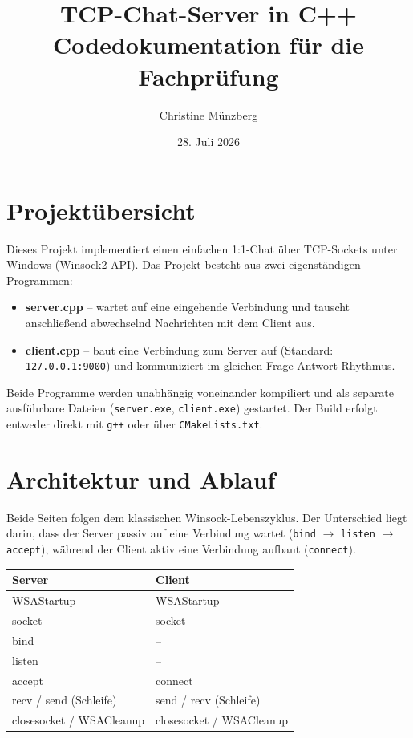 \documentclass[a4paper,11pt]{article}
\title{TCP-Chat-Server in C++\\\large Codedokumentation für die Fachprüfung}
\author{Christine Münzberg}
\date{28. Juli 2026}
\begin{document}
\maketitle
\thispagestyle{empty}

\tableofcontents
\newpage

\section{Projektübersicht}

Dieses Projekt implementiert einen einfachen 1:1-Chat über TCP-Sockets unter
Windows (Winsock2-API). Das Projekt besteht aus zwei eigenständigen
Programmen:

\begin{itemize}
    \item \textbf{server.cpp} -- wartet auf eine eingehende Verbindung und
    tauscht anschließend abwechselnd Nachrichten mit dem Client aus.
    \item \textbf{client.cpp} -- baut eine Verbindung zum Server auf
    (Standard: \texttt{127.0.0.1:9000}) und kommuniziert im gleichen
    Frage-Antwort-Rhythmus.
\end{itemize}

Beide Programme werden unabhängig voneinander kompiliert und als separate
ausführbare Dateien (\texttt{server.exe}, \texttt{client.exe}) gestartet.
Der Build erfolgt entweder direkt mit \texttt{g++} oder über
\texttt{CMakeLists.txt}.

\section{Architektur und Ablauf}

Beide Seiten folgen dem klassischen Winsock-Lebenszyklus. Der Unterschied
liegt darin, dass der Server passiv auf eine Verbindung wartet (\texttt{bind}
$\rightarrow$ \texttt{listen} $\rightarrow$ \texttt{accept}), während der
Client aktiv eine Verbindung aufbaut (\texttt{connect}).

\begin{center}
\begin{tabular}{|l|l|}
\hline
\textbf{Server} & \textbf{Client} \\
\hline
WSAStartup & WSAStartup \\
socket & socket \\
bind & -- \\
listen & -- \\
accept & connect \\
recv / send (Schleife) & send / recv (Schleife) \\
closesocket / WSACleanup & closesocket / WSACleanup \\
\hline
\end{tabular}
\end{center}
\end{document}

